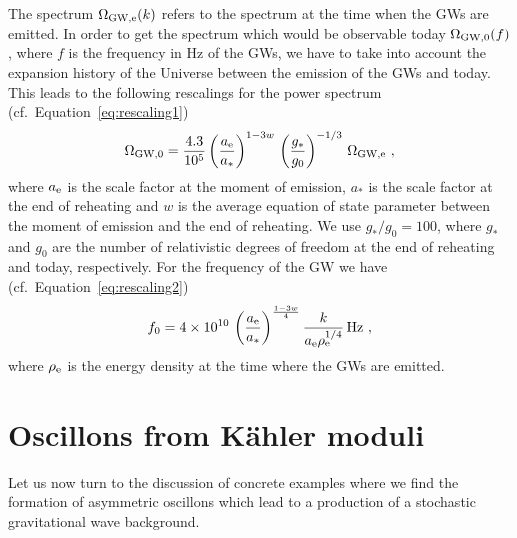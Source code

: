 \documentclass[12pt]{article}
\newcommand{\be}{\begin{equation}}
\newcommand{\ee}{\end{equation}}
\begin{document}
The spectrum $\Omega_{\rm GW, \rm e}(k)$ refers to the spectrum at the time when the GWs are emitted. In order to get the spectrum which would be observable today $\Omega_{\rm GW,0}(f)$, where $f$ is the frequency in Hz of the GWs, we have to take into account the expansion history of the Universe between the emission of the GWs and today. This leads to the following rescalings for the power spectrum (cf.~Equation~\eqref{eq:rescaling1})
\be
\Omega_{\rm GW,0} = \frac{4.3}{10^5}\left(\frac{a_{\rm e}}{a_*}\right)^{1-3w}\,\left(\frac{g_*}{g_0}\right)^{-1/3}\,\Omega_{\rm GW,\rm e}~,
\label{eq:OmegaGW_today}
\ee
where $a_{\rm e}$ is the scale factor at the moment of emission, $a_*$ is the scale factor at the end of reheating and $w$ is the average equation of state parameter between the moment of emission and the end of reheating. We use $g_*/g_0=100$, where $g_*$ and $g_0$ are the number of relativistic degrees of freedom at the end of reheating and today, respectively. For the frequency of the GW we have (cf.~Equation~\eqref{eq:rescaling2})
\be
f_0 = 4\times10^{10}\,\left(\frac{a_{\rm e}}{a_*}\right)^{\frac{1-3w}{4}} \frac{k}{a_{\rm e}\rho_{\rm e}^{1/4}}\,\textrm{Hz}~,
\label{eq:GW_freq_today}
\ee
where $\rho_{\rm e}$ is the energy density at the time where the GWs are emitted.



\section{Oscillons from K\"ahler  moduli}
\label{sec:example}
Let us now turn to the discussion of concrete examples where we find the formation of asymmetric oscillons which lead to a production of a stochastic gravitational wave background. 
\end{document}
